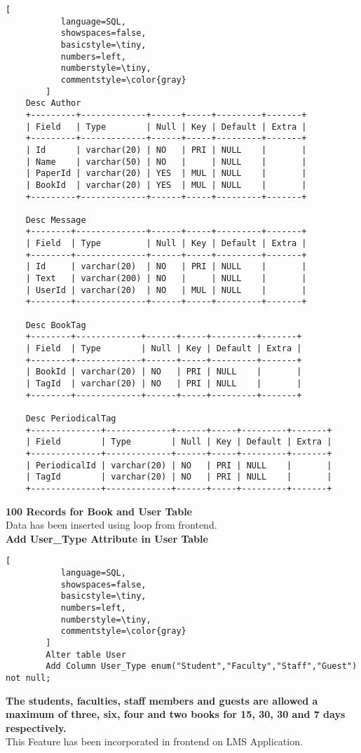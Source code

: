 \documentclass[12pt]{article}
\begin{document}
\begin{lstlisting}[
           language=SQL,
           showspaces=false,
           basicstyle=\tiny,
           numbers=left,
           numberstyle=\tiny,
           commentstyle=\color{gray}
        ]
	Desc Author
	+---------+-------------+------+-----+---------+-------+
	| Field   | Type        | Null | Key | Default | Extra |
	+---------+-------------+------+-----+---------+-------+
	| Id      | varchar(20) | NO   | PRI | NULL    |       |
	| Name    | varchar(50) | NO   |     | NULL    |       |
	| PaperId | varchar(20) | YES  | MUL | NULL    |       |
	| BookId  | varchar(20) | YES  | MUL | NULL    |       |
	+---------+-------------+------+-----+---------+-------+

	Desc Message
	+--------+--------------+------+-----+---------+-------+
	| Field  | Type         | Null | Key | Default | Extra |
	+--------+--------------+------+-----+---------+-------+
	| Id     | varchar(20)  | NO   | PRI | NULL    |       |
	| Text   | varchar(200) | NO   |     | NULL    |       |
	| UserId | varchar(20)  | NO   | MUL | NULL    |       |
	+--------+--------------+------+-----+---------+-------+

	Desc BookTag
	+--------+-------------+------+-----+---------+-------+
	| Field  | Type        | Null | Key | Default | Extra |
	+--------+-------------+------+-----+---------+-------+
	| BookId | varchar(20) | NO   | PRI | NULL    |       |
	| TagId  | varchar(20) | NO   | PRI | NULL    |       |
	+--------+-------------+------+-----+---------+-------+

	Desc PeriodicalTag
	+--------------+-------------+------+-----+---------+-------+
	| Field        | Type        | Null | Key | Default | Extra |
	+--------------+-------------+------+-----+---------+-------+
	| PeriodicalId | varchar(20) | NO   | PRI | NULL    |       |
	| TagId        | varchar(20) | NO   | PRI | NULL    |       |
	+--------------+-------------+------+-----+---------+-------+
\end{lstlisting}
\textbf{100 Records for Book and User Table}\\
Data has been inserted using loop from frontend.\\
\textbf{Add User\_Type Attribute in User Table}\\
\begin{lstlisting}[
           language=SQL,
           showspaces=false,
           basicstyle=\tiny,
           numbers=left,
           numberstyle=\tiny,
           commentstyle=\color{gray}
        ]
        Alter table User
        Add Column User_Type enum("Student","Faculty","Staff","Guest") not null;
\end{lstlisting}
\textbf{The students, faculties, staff members and guests are allowed a maximum of three, six,
four and two books for 15, 30, 30 and 7 days respectively.}\\
This Feature has been incorporated in frontend on LMS Application.\\
\end{document}
